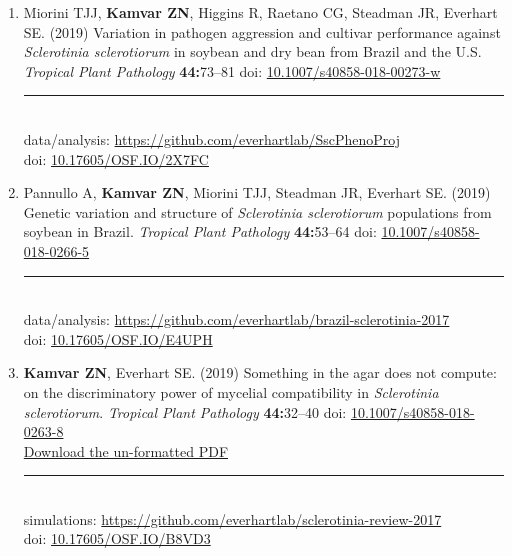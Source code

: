\begin{enumerate}[leftmargin = 14pt]
  \item Miorini TJJ, \textbf{Kamvar ZN}, Higgins R, Raetano CG, Steadman JR,
    Everhart SE. (2019) Variation in pathogen aggression and cultivar
    performance against \textit{Sclerotinia sclerotiorum} in soybean and dry
    bean from Brazil and the U.S. \textit{Tropical Plant Pathology} \textbf{44:}73--81 doi:
    \href{https://doi.org/10.1007/s40858-018-00273-w}{10.1007/s40858-018-00273-w}\\
	\rule[0.25\baselineskip]{0.25\textwidth}{0.5pt}\\
  data/analysis: \href{https://github.com/everhartlab/SscPhenoProj#readme}{https://github.com/everhartlab/SscPhenoProj}\\
  doi:\phantom{t/analysis:} \href{https://doi.org/10.17605/OSF.IO/2X7FC}{10.17605/OSF.IO/2X7FC} 

	\vspace{3pt}
  
  \item Pannullo A, \textbf{Kamvar ZN}, Miorini TJJ, Steadman JR, Everhart SE.
    (2019) Genetic variation and structure of \textit{Sclerotinia sclerotiorum}
    populations from soybean in Brazil. \textit{Tropical Plant Pathology} \textbf{44:}53--64 doi:
    \href{https://doi.org/10.1007/s40858-018-0266-5}{10.1007/s40858-018-0266-5}\\
	\rule[0.25\baselineskip]{0.25\textwidth}{0.5pt}\\
  data/analysis: \href{https://github.com/everhartlab/brazil-sclerotinia-2017#readme}{https://github.com/everhartlab/brazil-sclerotinia-2017}\\
  doi:\phantom{t/analysis:}  \href{https://doi.org/10.17605/OSF.IO/E4UPH}{10.17605/OSF.IO/E4UPH} 

	\vspace{3pt}
  
  \item \textbf{Kamvar ZN}, Everhart SE. (2019) Something in the agar does not
    compute: on the discriminatory power of mycelial compatibility in
    \textit{Sclerotinia sclerotiorum}. \textit{Tropical Plant Pathology} \textbf{44:}32--40  doi:
    \href{https://doi.org/10.1007/s40858-018-0263-8}{10.1007/s40858-018-0263-8}\\
    \href{https://github.com/everhartlab/sclerotinia-review-2017/raw/master/manuscript/review.pdf}{Download the un-formatted PDF}\\
	\rule[0.25\baselineskip]{0.25\textwidth}{0.5pt}\\
  simulations: \href{https://github.com/everhartlab/sclerotinia-review-2017#readme}{https://github.com/everhartlab/sclerotinia-review-2017}\\
    doi:\phantom{mlatons:} \href{https://doi.org/10.17605/OSF.IO/B8VD3}{10.17605/OSF.IO/B8VD3} 


\end{enumerate}
